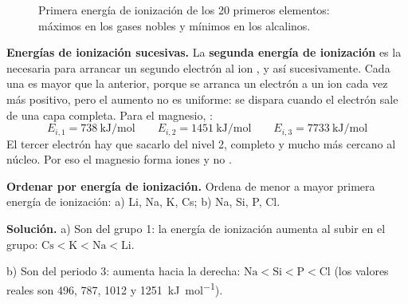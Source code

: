 \begin{figure}[H]
    \centering
    \caption{Primera energía de ionización de los 20 primeros elementos: máximos en los gases nobles y mínimos en los alcalinos.}
    \label{fig:ud3-ei}
\end{figure}

\begin{remark}
    \textbf{Energías de ionización sucesivas.} La \textbf{segunda energía de ionización} es la necesaria para arrancar un segundo
    electrón al ion , y así sucesivamente. Cada una es mayor que la anterior, porque se arranca un electrón a un ion
    cada vez más positivo, pero el aumento no es uniforme: se dispara cuando el electrón sale de una capa completa. Para el
    magnesio, :
    \[ E_{i,1} = \qty{738}{\kilo\joule\per\mol} \qquad E_{i,2} = \qty{1451}{\kilo\joule\per\mol} \qquad E_{i,3} = \qty{7733}{\kilo\joule\per\mol} \]
    El tercer electrón hay que sacarlo del nivel 2, completo y mucho más cercano al núcleo. Por eso el magnesio forma iones
     y no .
\end{remark}

\begin{example}
    \textbf{Ordenar por energía de ionización.} Ordena de menor a mayor primera energía de ionización: a) Li, Na, K, Cs;
    b) Na, Si, P, Cl.

    \textbf{Solución.} a) Son del grupo 1: la energía de ionización aumenta al subir en el grupo:
    \(\mathrm{Cs} < \mathrm{K} < \mathrm{Na} < \mathrm{Li}\).

    b) Son del periodo 3: aumenta hacia la derecha: \(\mathrm{Na} < \mathrm{Si} < \mathrm{P} < \mathrm{Cl}\) (los valores reales
    son 496, 787, 1012 y \qty{1251}{\kilo\joule\per\mol}).
\end{example}

